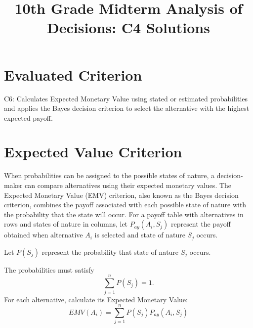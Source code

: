 \makeatletter
{}
\makeatother

%


\title{10th Grade Midterm Analysis of Decisions: C4 Solutions}
\author{}
\date{}

\pagestyle{empty}


	
	\maketitle
	\vspace*{-2.5cm}
	
	
	\section*{Evaluated Criterion}
	
	C6: Calculates Expected Monetary Value using stated or estimated probabilities and applies the Bayes decision criterion to select the alternative with the highest expected payoff.
	
	
	\section{Expected Value Criterion}
	
	When probabilities can be assigned to the possible states of nature,
	a decision-maker can compare alternatives using their expected monetary
	values. The Expected Monetary Value (EMV) criterion, also known as the Bayes decision criterion, combines the payoff associated with each possible state of nature with the probability that the state will occur.
	For a payoff table with alternatives in rows and states of nature in
	columns, let
	$
	P_{ay}(A_i,S_j)
	$
	represent the payoff obtained when alternative $A_i$ is selected and
	state of nature $S_j$ occurs.
	\begin{center}
		Let $P(S_j)$ represent the probability that state of nature $S_j$ occurs.
	\end{center}
	The probabilities must satisfy
	$$
	\sum_{j=1}^{n} P(S_j) = 1.
	$$
	For each alternative, calculate its Expected Monetary Value:
	$$
	EMV(A_i)
	=
	\sum_{j=1}^{n}
	P(S_j)P_{ay}(A_i,S_j)
	$$
	
